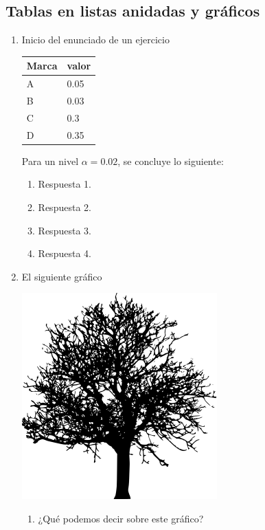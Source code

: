 \documentclass[
  letterpaper,
  DIV=11,
  numbers=noendperiod]{scrartcl}
\begin{document}
\newpage{}

\subsection{Tablas en listas anidadas y
gráficos}\label{tablas-en-listas-anidadas-y-gruxe1ficos}

\begin{enumerate}
\def\labelenumi{\arabic{enumi}.}
\item
  Inicio del enunciado de un ejercicio

  \begin{longtable}[]{@{}ll@{}}
  \toprule\noalign{}
  Marca & valor \\
  \midrule\noalign{}
  \endhead
  \bottomrule\noalign{}
  \endlastfoot
  A & 0.05 \\
  B & 0.03 \\
  C & 0.3 \\
  D & 0.35 \\
  \end{longtable}

  Para un nivel \(\alpha=0.02\), se concluye lo siguiente:

  \begin{enumerate}
  \def\labelenumii{\alph{enumii}.}
  \item
    Respuesta 1.
  \item
    Respuesta 2.
  \item
    Respuesta 3.
  \item
    Respuesta 4.
  \end{enumerate}
\item
  El siguiente gráfico

  \includegraphics[width=0.4\linewidth,height=\textheight,keepaspectratio]{tree_01.png}

  \begin{enumerate}
  \def\labelenumii{(\Alph{enumii})}
  \item
    ¿Qué podemos decir sobre este gráfico?


\end{enumerate}
\end{enumerate}
\end{document}

